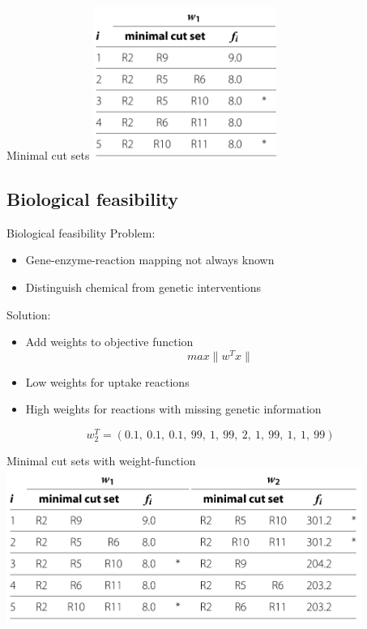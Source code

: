 \documentclass{beamer}
\begin{document}
\begin{frame}{Minimal cut sets}
    \includegraphics[height=5cm]{grafik/table2a} \\
\end{frame}

\subsection{Biological feasibility}

\begin{frame}{Biological feasibility}
    Problem:
    \begin{itemize}
        \item Gene-enzyme-reaction mapping not always known
        \item Distinguish chemical from genetic interventions
    \end{itemize}
\pause
    Solution: 
    \begin{itemize}
        \item Add weights to objective function
        $$max \|w^T x\| $$
        \item Low weights for uptake reactions
        \item High weights for reactions with missing genetic information
    \end{itemize}
    \begin{example}
        $$w_2^T = (0.1, ~ 0.1, ~ 0.1, ~ 99, ~ 1, ~ 99, ~ 2, ~ 1, ~ 99, ~ 1, ~ 1, ~ 99)$$
    \end{example}
\end{frame}

\begin{frame}{Minimal cut sets with weight-function}
    \includegraphics[height=5cm]{grafik/table2} \\
\end{frame}
\end{document}
